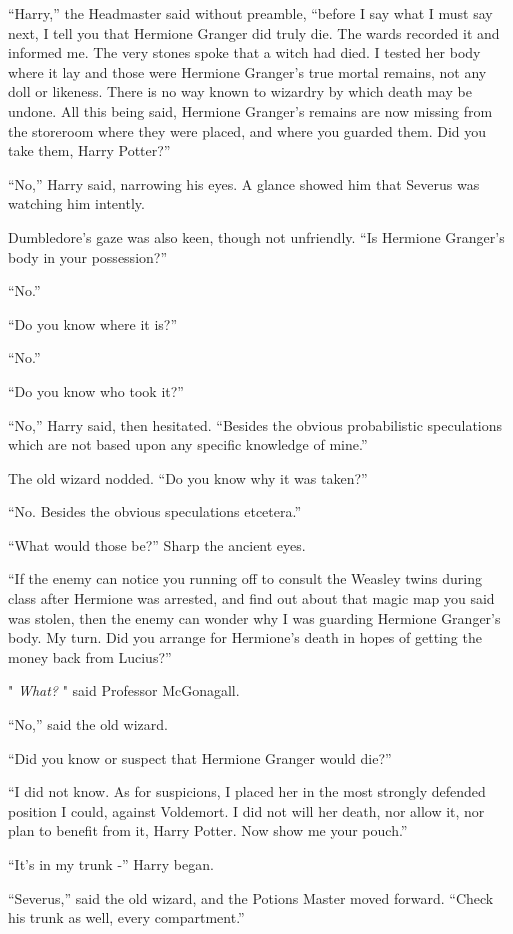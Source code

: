 ``Harry,'' the Headmaster said without preamble, ``before I say what I
must say next, I tell you that Hermione Granger did truly die. The wards
recorded it and informed me. The very stones spoke that a witch had
died. I tested her body where it lay and those were Hermione Granger's
true mortal remains, not any doll or likeness. There is no way known to
wizardry by which death may be undone. All this being said, Hermione
Granger's remains are now missing from the storeroom where they were
placed, and where you guarded them. Did you take them, Harry Potter?''

``No,'' Harry said, narrowing his eyes. A glance showed him that Severus
was watching him intently.

Dumbledore's gaze was also keen, though not unfriendly. ``Is Hermione
Granger's body in your possession?''

``No.''

``Do you know where it is?''

``No.''

``Do you know who took it?''

``No,'' Harry said, then hesitated. ``Besides the obvious probabilistic
speculations which are not based upon any specific knowledge of mine.''

The old wizard nodded. ``Do you know why it was taken?''

``No. Besides the obvious speculations etcetera.''

``What would those be?'' Sharp the ancient eyes.

``If the enemy can notice you running off to consult the Weasley twins
during class after Hermione was arrested, and find out about that magic
map you said was stolen, then the enemy can wonder why I was guarding
Hermione Granger's body. My turn. Did you arrange for Hermione's death
in hopes of getting the money back from Lucius?''

" \emph{What?} " said Professor McGonagall.

``No,'' said the old wizard.

``Did you know or suspect that Hermione Granger would die?''

``I did not know. As for suspicions, I placed her in the most strongly
defended position I could, against Voldemort. I did not will her death,
nor allow it, nor plan to benefit from it, Harry Potter. Now show me
your pouch.''

``It's in my trunk -'' Harry began.

``Severus,'' said the old wizard, and the Potions Master moved forward.
``Check his trunk as well, every compartment.''

